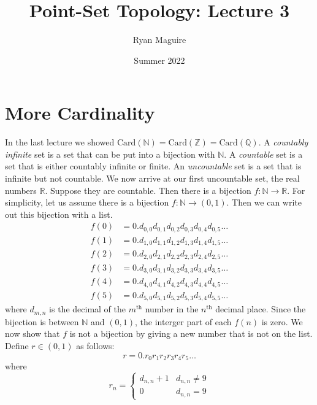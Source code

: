 \documentclass{article}
\title{Point-Set Topology: Lecture 3}
\author{Ryan Maguire}
\date{Summer 2022}
\theoremstyle{plain}
\theoremstyle{normal}
\begin{document}
    \maketitle
    \section{More Cardinality}
        In the last lecture we showed
        $\textrm{Card}(\mathbb{N})=\textrm{Card}(\mathbb{Z})=\textrm{Card}(\mathbb{Q})$.
        A \textit{countably infinite} set is a set that can be put into a
        bijection with $\mathbb{N}$. A \textit{countable} set is a set that
        is either countably infinite or finite. An \textit{uncountable} set is
        a set that is infinite but not countable. We now arrive at our first
        uncountable set, the real numbers $\mathbb{R}$. Suppose they are
        countable. Then there is a bijection
        $f:\mathbb{N}\rightarrow\mathbb{R}$. For simplicity, let us assume there
        is a bijection $f:\mathbb{N}\rightarrow(0,1)$. Then we can write out
        this bijection with a list.
        \begin{align}
            f(0)&=0.d_{0,0}d_{0,1}d_{0,2}d_{0,3}d_{0,4}d_{0,5}\dots\\
            f(1)&=0.d_{1,0}d_{1,1}d_{1,2}d_{1,3}d_{1,4}d_{1,5}\dots\\
            f(2)&=0.d_{2,0}d_{2,1}d_{2,2}d_{2,3}d_{2,4}d_{2,5}\dots\\
            f(3)&=0.d_{3,0}d_{3,1}d_{3,2}d_{3,3}d_{3,4}d_{3,5}\dots\\
            f(4)&=0.d_{4,0}d_{4,1}d_{4,2}d_{4,3}d_{4,4}d_{4,5}\dots\\
            f(5)&=0.d_{5,0}d_{5,1}d_{5,2}d_{5,3}d_{5,4}d_{5,5}\dots
        \end{align}
        where $d_{m,n}$ is the decimal of the $m^{\textrm{th}}$ number in the
        $n^{\textrm{th}}$ decimal place. Since the bijection is between
        $\mathbb{N}$ and $(0,1)$, the interger part of each $f(n)$ is zero.
        We now show that $f$ is not a bijection by giving a new number that is
        not on the list. Define $r\in(0,1)$ as follows:
        \begin{equation}
            r=0.r_{0}r_{1}r_{2}r_{3}r_{4}r_{5}\dots
        \end{equation}
        where
        \begin{equation}
            r_{n}=
            \begin{cases}
                d_{n,n}+1&d_{n,n}\ne{9}\\
                0&d_{n,n}=9
            \end{cases}
        \end{equation}
\end{document}
